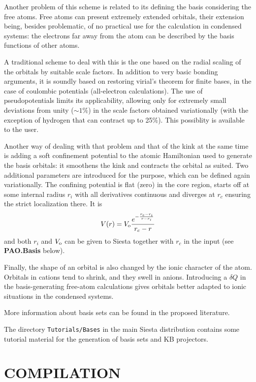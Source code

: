 \documentclass[11pt]{article}
\begin{document}
  Another problem of this scheme is related to its defining the
basis considering the free atoms. 
  Free atoms can present extremely
extended orbitals, their extension being, besides problematic,
of no practical use for the calculation in condensed systems:
the electrons far away from the atom can be described by the
basis functions of other atoms.
 
  A traditional scheme to deal with this is the one based on the radial 
scaling of the orbitals by suitable scale factors.
  In addition to very basic bonding arguments, it is
soundly based on restoring virial's theorem for finite bases, in the case
of coulombic potentials (all-electron calculations).
  The use of pseudopotentials limits its applicability, allowing only for
extremely small deviations from unity ($\sim 1\%$) in the scale factors 
obtained variationally (with the exception of hydrogen that can contract 
up to 25\%). This possiblity is available to the user.

  Another way of dealing with that problem and that of the kink at the
same time is adding a soft confinement potential to the atomic Hamiltonian 
used to generate the basis orbitals: it smoothens
the kink and contracts the orbital as suited. Two additional parameters
are introduced for the purpose, which can be defined again variationally.
  The confining potential  is flat (zero) in the core region, starts off at
some internal radius $r_i$ with all derivatives continuous
and diverges at $r_c$ ensuring the strict localization there.
  It is
\begin{equation}
  V(r) = V_{\rm o} { e^{- { {r_c - r_i} \over {r - r_i} } } \over {r_c -r} } 
\end{equation}
and both $r_i$ and $V_{\rm o}$ can be given to {\sc Siesta} together
with $r_c$ in the input (see {\bf PAO.Basis} below).

  Finally, the shape of an orbital is also changed by the ionic character 
of the atom. 
  Orbitals in cations tend to shrink, and they swell in anions.
  Introducing a $\delta Q$ in the basis-generating free-atom calculations
gives orbitals better adapted to ionic situations in the condensed
systems.

  More information about basis sets can be found in the proposed
  literature.

The directory {\tt Tutorials/Bases} in the main {\sc Siesta
  distribution} contains some tutorial material for the generation of
basis sets and KB projectors.

\section{COMPILATION}
\end{document}
